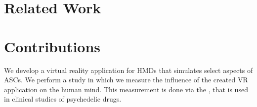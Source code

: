 \section{Related Work}

\section{Contributions}
We develop a virtual reality application for \acp{HMD} that simulates select aspects of \acp{ASC}.
We perform a study in which we measure the influence of the created \ac{VR} application on the human mind. This measurement is done via the , that is used in clinical studies of psychedelic drugs.
